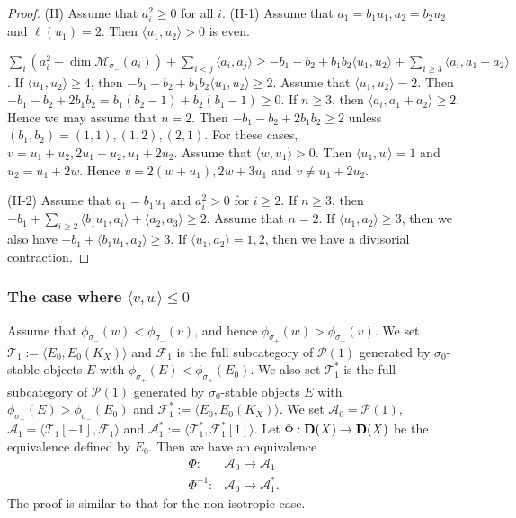 \documentclass[leqno,11pt]{amsart}
\def\dim{\mathop{\mathrm{dim}}\nolimits}
\theoremstyle{definition}
\def\AA{\ensuremath{\mathcal A}}
\def\FF{\ensuremath{\mathcal F}}
\def\MM{\ensuremath{\mathcal M}}
\def\PP{\ensuremath{\mathcal P}}
\def\TT{\ensuremath{\mathcal T}}
\begin{document}
\begin{proof}
(II)
Assume that $a_i^2 \geq 0$ for all $i$.
(II-1)
Assume that $a_1=b_1 u_1, a_2=b_2 u_2$ and
$\ell(u_1)=2$.
Then $\langle u_1,u_2 \rangle>0$ is even.
 
$\sum_i(a_i^2-\dim \MM_{\sigma_-}(a_i))+\sum_{i<j}\langle a_i,a_j \rangle
\geq -b_1-b_2+b_1 b_2 \langle u_1,u_2 \rangle+
\sum_{i \geq 3}\langle a_i,a_1+a_2 \rangle$.
If $\langle u_1,u_2 \rangle \geq 4$, then
$-b_1-b_2+b_1 b_2 \langle u_1,u_2 \rangle \geq 2$.
Assume that $\langle u_1,u_2 \rangle =2$.
Then $-b_1-b_2+2b_1 b_2 =
b_1(b_2-1)+b_2(b_1-1) \geq 0$.
If $n \geq 3$, then $\langle a_i,a_1+a_2 \rangle \geq 2$.
Hence we may assume that $n=2$.
Then $-b_1-b_2+2b_1 b_2 \geq 2$ unless
$(b_1,b_2)=(1,1),(1,2),(2,1)$.
For these cases, $v=u_1+u_2, 2u_1+u_2,u_1+2u_2$.
Assume that $\langle w,u_1 \rangle>0$. Then
$\langle u_1,w \rangle=1$ and $u_2=u_1+2w$.
Hence $v=2(w+u_1),2w+3u_1$ and 
$v \ne u_1+2u_2$.

(II-2)
Assume that $a_1=b_1 u_1$ and $a_i^2>0$ for $i \geq 2$.
If $n \geq3$, then 
$-b_1+\sum_{i \geq 2} \langle b_1 u_1,a_i \rangle +\langle a_2,a_3 \rangle
\geq 2$.
Assume that $n=2$. 
If $\langle u_1,a_2 \rangle \geq 3$, then
we also have $-b_1+\langle b_1 u_1,a_2 \rangle \geq 3$.
If $\langle u_1,a_2 \rangle=1,2$, then
we have a divisorial contraction.

\end{proof}




\subsubsection{The case where $\langle v,w \rangle \leq 0$}

Assume that $\phi_{\sigma_-}(w)<\phi_{\sigma_-}(v)$, and hence
$\phi_{\sigma_+}(w)>\phi_{\sigma_+}(v)$.
We set 
$\TT_1:=\langle E_0,E_0(K_X) \rangle$ and
$\FF_1$ is the full subcategory of 
$\PP(1)$ generated by $\sigma_0$-stable objects $E$
with $\phi_{\sigma_+}(E)<\phi_{\sigma_+}(E_0)$.
We also set
$\TT_1^*$ is the full subcategory of 
$\PP(1)$ generated by $\sigma_0$-stable objects $E$
with $\phi_{\sigma_-}(E)>\phi_{\sigma_-}(E_0)$
and
$\FF_1^*:=\langle E_0,E_0(K_X) \rangle$.
We set $\AA_0=\PP(1)$,
$\AA_1=\langle \TT_1[-1],\FF_1 \rangle$ and
$\AA_1^*:=\langle \TT_1^*,\FF_1^*[1] \rangle$.
 Let $\Phi:{\bf D}(X) \to {\bf D}(X)$ be the equivalence
defined by $E_0$.
Then we have an equivalence
\begin{equation}
\begin{split}
\Phi:& \AA_0 \to \AA_1\\
\Phi^{-1}:&\AA_0 \to \AA_1^*.
\end{split}
\end{equation}
The proof is similar to that for the non-isotropic case.
\end{document}
